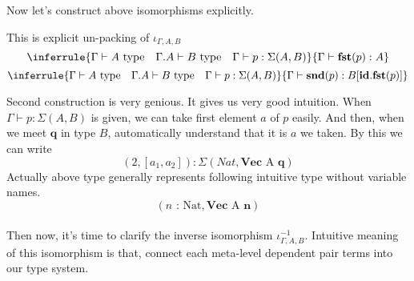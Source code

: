 \documentclass[12pt, a4paper, openany, twoside]{book}
\theoremstyle{definition}
\theoremstyle{remark}
\theoremstyle{plain}
\numberwithin{equation}{section}
\begin{document}
Now let's construct above isomorphisms explicitly. 

\begin{tcolorbox}[colback=yellow!10!white,colframe=green!75!black,title=Construction 2.2.2.]
This is explicit un-packing of $\iota_{\Gamma, A, B}$ 
\[
\inferrule
{ \Gamma \vdash A \text{ type} \quad \Gamma.A \vdash B \text{ type} \quad \Gamma \vdash p : \Sigma(A, B)}
{ \Gamma \vdash \mathbf{fst}(p) : A}
\]
\[
\inferrule
{ \Gamma \vdash A \text{ type} \quad \Gamma.A \vdash B \text{ type} \quad \Gamma \vdash p : \Sigma(A, B)}
{ \Gamma \vdash \mathbf{snd}(p) : B[\mathbf{id.fst}(p)]}
\]
\end{tcolorbox}

Second construction is very genious. It gives us very good intuition. When $\Gamma \vdash p : \Sigma(A, B)$ is given, 
we can take first element $a$ of $p$ easily. And then, when we meet $\mathbf{q}$ in type $B$, 
automatically understand that it is $a$ we taken. By this we can write 
\[(2, [a_1, a_2]) : \Sigma(Nat, \mathbf{Vec} \text{ A }\mathbf{q})\]
Actually above type generally represents following intuitive type without variable names. 
\[(n\text{ : Nat}, \mathbf{Vec }\text{ A }\mathbf{n})\] 
\\
Then now, it's time to clarify the inverse isomorphism $\iota_{\Gamma, A, B}^{-1}$. Intuitive meaning of this isomorphism is that, 
connect each meta-level dependent pair terms into our type system. 
\end{document}
